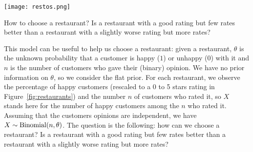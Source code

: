\begin{marginfigure}
	\texttt{[image: restos.png]}
	\caption{How to choose a restaurant? Is a restaurant with a good rating but few rates better than a restaurant with a slightly worse rating but more rates?}
	\label{fig:restaurants}
\end{marginfigure}
This model can be useful to help us choose a restaurant: given a restaurant, $\theta$ is the unknown probability that a customer is happy ($1$) or unhappy ($0$) with it and $n$ is the number of customers who gave their (binary) opinion.
We have no prior information on $\theta$, so we consider the flat prior.
For each restaurant, we observe the percentage of happy customers (rescaled to a 0 to 5 stars rating in Figure~\ref{fig:restaurants}) and the number $n$ of customers who rated it, so $X$ stands here for the number of happy customers among the $n$ who rated it. 
Assuming that the customers opinions are independent, we have $X \sim \operatorname{Binomial}(n, \theta)$.
The question is the following: how can we choose a restaurant? Is a restaurant with a good rating but few rates better than a restaurant with a slightly worse rating but more rates?


